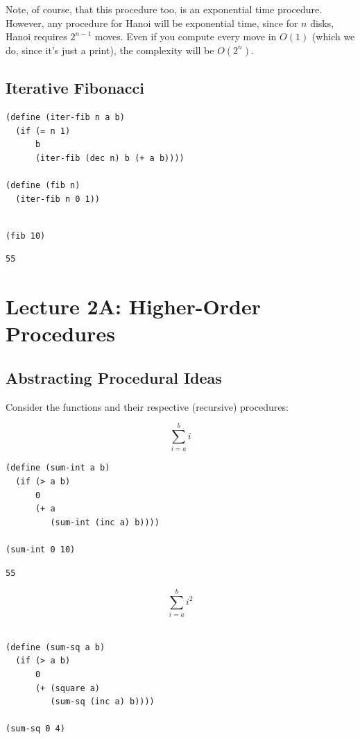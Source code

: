 \documentclass[9pt]{report}
\begin{document}
Note, of course, that this procedure too, is an exponential time
procedure. However, any procedure for Hanoi will be exponential
time, since for \(n\) disks, Hanoi requires \(2^{n-1}\) moves. Even if
you compute every move in \(O(1)\) (which we do, since it's just a
print), the complexity will be \(O(2^n)\).

\section{Iterative Fibonacci}
\label{sec:org10eea15}

\begin{verbatim}
(define (iter-fib n a b)
  (if (= n 1)
      b
      (iter-fib (dec n) b (+ a b))))

(define (fib n)
  (iter-fib n 0 1))
\end{verbatim}

\begin{verbatim}

(fib 10)
\end{verbatim}

\begin{verbatim}
55
\end{verbatim}

\chapter{Lecture 2A: Higher-Order Procedures}
\label{sec:orgf871da0}

\section{Abstracting Procedural Ideas}
\label{sec:org9e93ff0}

Consider the functions and their respective (recursive) procedures:

$$\sum_{i=a}^{b} i$$

\begin{verbatim}
(define (sum-int a b)
  (if (> a b)
      0
      (+ a
         (sum-int (inc a) b))))

(sum-int 0 10)
\end{verbatim}

\begin{verbatim}
55
\end{verbatim}


$$\sum_{i=a}^{b} i^{2}$$

\begin{verbatim}

(define (sum-sq a b)
  (if (> a b)
      0
      (+ (square a)
         (sum-sq (inc a) b))))

(sum-sq 0 4)
\end{verbatim}
\end{document}
